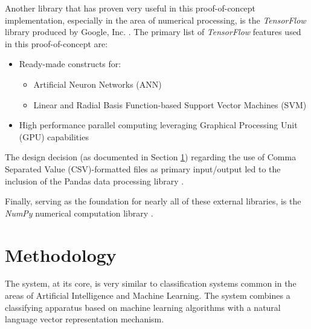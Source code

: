 \documentclass[conference]{sig-alternate-05-2015}
\begin{document}
Another library that has proven very useful in this proof-of-concept
implementation, especially in the area of numerical processing, is the
\textit{TensorFlow} library produced by Google, Inc.
\cite{tensorflow2015-whitepaper}. The primary list of \textit{TensorFlow}
features used in this proof-of-concept are:
\begin{itemize}
  \item Ready-made constructs for:
  \begin{itemize}
    \item Artificial Neuron Networks (ANN)
    \item Linear and Radial Basis Function-based Support Vector Machines (SVM)
  \end{itemize}
  \item High performance parallel computing leveraging Graphical Processing
  Unit (GPU) capabilities
\end{itemize}

The design decision (as documented in Section \ref{sec:design}) regarding the
use of Comma Separated Value (CSV)-formatted files as primary input/output led
to the inclusion of the Pandas data processing library
\cite{mckinney-proc-scipy-2010}.

Finally, serving as the foundation for nearly all of these external libraries,
is the \textit{NumPy} numerical computation library \cite{oliphant2006guide}.

\section{Methodology}\label{sec:design}

The system, at its core, is very similar to classification systems
common in the areas of Artificial Intelligence and Machine Learning. The system
combines a classifying apparatus based on machine learning algorithms with a
natural language vector representation mechanism.
\end{document}
